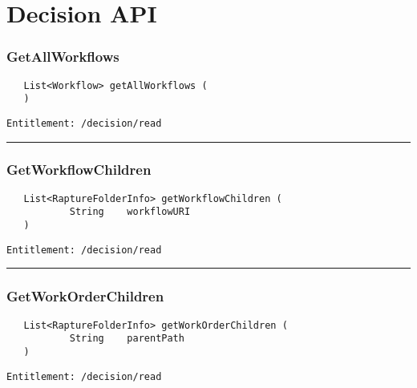 \chapter{Decision API}

\subsection{GetAllWorkflows}
\label{Api:GetAllWorkflows}
\begin{verbatim}
   List<Workflow> getAllWorkflows (
   )
\end{verbatim}
\begin{Verbatim}[fontsize=\small, formatcom=\color{Maroon}]
  Entitlement: /decision/read
\end{Verbatim}



\rule{12cm}{2pt}
\subsection{GetWorkflowChildren}
\label{Api:GetWorkflowChildren}
\begin{verbatim}
   List<RaptureFolderInfo> getWorkflowChildren (
           String    workflowURI
   )
\end{verbatim}
\begin{Verbatim}[fontsize=\small, formatcom=\color{Maroon}]
  Entitlement: /decision/read
\end{Verbatim}



\rule{12cm}{2pt}
\subsection{GetWorkOrderChildren}
\label{Api:GetWorkOrderChildren}
\begin{verbatim}
   List<RaptureFolderInfo> getWorkOrderChildren (
           String    parentPath
   )
\end{verbatim}
\begin{Verbatim}[fontsize=\small, formatcom=\color{Maroon}]
  Entitlement: /decision/read
\end{Verbatim}



